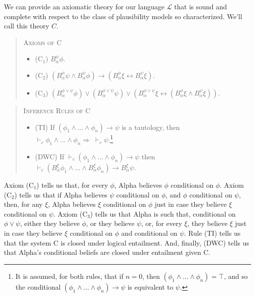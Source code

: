 We can provide an axiomatic theory for our language $\mathcal{L}$ that is sound and complete with respect to the class of plausibility models so characterized.
We'll call this theory $C$.
\begin{quote}
\textsc{Axioms of C}
\begin{itemize}
\item[](C$_1$) \quad $B_\alpha^\phi \phi$.
\item[](C$_2$) \quad $(B_\alpha^\phi \psi \wedge B_\alpha^\psi \phi) \rightarrow (B_\alpha^\phi \xi \leftrightarrow B_\alpha^\psi \xi)$.
\item[](C$_3$) \quad $(B_\alpha^{\phi \vee \psi} \phi) \vee (B_\alpha^{\phi \vee \psi} \psi) \vee (B_\alpha^{\phi \vee \psi} \xi \leftrightarrow (B_\alpha^{\phi} \xi \wedge B_\alpha^{\psi} \xi))$.
\end{itemize}
\end{quote}
\begin{quote}
\textsc{Inference Rules of C}
\begin{itemize}
\item[](TI) \quad  If $(\phi_1 \wedge\ldots\wedge \phi_n) \rightarrow \psi$ is a tautology, then $\vdash_{c} \phi_1 \wedge\ldots\wedge \phi_n \Rightarrow \; \vdash_{c} \psi$.\footnote{It is assumed, for both rules, that if $n = 0$, then $(\phi_1 \wedge\ldots\wedge \phi_n) = \top$, and so the conditional $(\phi_1 \wedge\ldots\wedge \phi_n) \rightarrow \psi$ is equivalent to $\psi$.}
\item[](DWC) \quad If $\vdash_{c} (\phi_1 \wedge\ldots\wedge \phi_n) \rightarrow \psi$ then $\vdash_{c} (B_\alpha^{\xi} \phi_1 \wedge\ldots\wedge B_\alpha^{\xi}\phi_n) \rightarrow B_\alpha^{\xi} \psi$.
\end{itemize}
\end{quote}
Axiom (C$_1$) tells us that, for every $\phi$, Alpha believes $\phi$ conditional on $\phi$.
Axiom (C$_2$) tells us that if Alpha believes $\psi$ conditional on $\phi$, and $\phi$ conditional on $\psi$, then, for any $\xi$, Alpha believes $\xi$ conditional on $\phi$ just in case they believe $\xi$ conditional on $\psi$.
Axiom (C$_3$) tells us that Alpha is such that, conditional on $\phi \vee \psi$, either they believe $\phi$, or they believe $\psi$, or, for every $\xi$, they believe $\xi$ just in case they believe $\xi$ conditional on $\phi$ and conditional on $\psi$.
Rule (TI) tells us that the system C is closed under logical entailment.
And, finally, (DWC) tells us that Alpha's conditional beliefs are closed under entailment given C.


